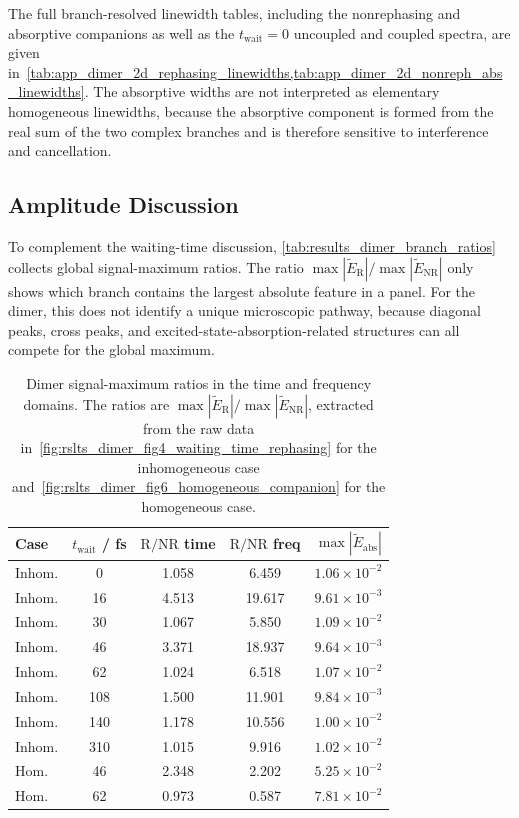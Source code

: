 The full branch-resolved linewidth tables, including the nonrephasing and absorptive companions as well as the \(t_{\mathrm{wait}}=0\) uncoupled and coupled spectra, are given in~\cref{tab:app_dimer_2d_rephasing_linewidths,tab:app_dimer_2d_nonreph_abs_linewidths}. The absorptive widths are not interpreted as elementary homogeneous linewidths, because the absorptive component is formed from the real sum of the two complex branches and is therefore sensitive to interference and cancellation.

\subsection{Amplitude Discussion}
\label{subsec:results_dimer_amplitudes}

To complement the waiting-time discussion, \autoref{tab:results_dimer_branch_ratios} collects global signal-maximum ratios. The ratio \(\max|\tilde{E}_{\mathrm{R}}|/\max|\tilde{E}_{\mathrm{NR}}|\) only shows which branch contains the largest absolute feature in a panel. For the dimer, this does not identify a unique microscopic pathway, because diagonal peaks, cross peaks, and excited-state-absorption-related structures can all compete for the global maximum.

\begin{table}[htbp]
    \centering
    \small
\caption{Dimer signal-maximum ratios in the time and frequency domains. The ratios are \(\max|\tilde{E}_{\mathrm{R}}|/\max|\tilde{E}_{\mathrm{NR}}|\), extracted from the raw data in~\autoref{fig:rslts_dimer_fig4_waiting_time_rephasing} for the inhomogeneous case and~\autoref{fig:rslts_dimer_fig6_homogeneous_companion} for the homogeneous case.}
    \label{tab:results_dimer_branch_ratios}
    \begin{tabular}{@{}lcccc@{}}
        \toprule
        Case & $t_{\mathrm{wait}}$ / fs & $\mathrm{R}/\mathrm{NR}$ time & $\mathrm{R}/\mathrm{NR}$ freq & $\max|\tilde{E}_{\mathrm{abs}}|$ \\
        \midrule
        Inhom. & 0   & 1.058 & 6.459  & $1.06\times10^{-2}$ \\
        Inhom. & 16  & 4.513 & 19.617 & $9.61\times10^{-3}$ \\
        Inhom. & 30  & 1.067 & 5.850  & $1.09\times10^{-2}$ \\
        Inhom. & 46  & 3.371 & 18.937 & $9.64\times10^{-3}$ \\
        Inhom. & 62  & 1.024 & 6.518  & $1.07\times10^{-2}$ \\
        Inhom. & 108 & 1.500 & 11.901 & $9.84\times10^{-3}$ \\
        Inhom. & 140 & 1.178 & 10.556 & $1.00\times10^{-2}$ \\
        Inhom. & 310 & 1.015 & 9.916  & $1.02\times10^{-2}$ \\
        Hom.   & 46  & 2.348 & 2.202  & $5.25\times10^{-2}$ \\
        Hom.   & 62  & 0.973 & 0.587  & $7.81\times10^{-2}$ \\
        \bottomrule
    \end{tabular}
\end{table}

